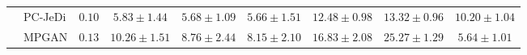 \begin{tabular}{llccccccc}
        & PC-JeDi  & $0.10$          & $5.83 \pm 1.44$                              & $5.68 \pm 1.09$                                & $5.66 \pm 1.51$                              & $12.48 \pm 0.98$                              & $13.32 \pm 0.96$                              & $10.20 \pm 1.04$                       \\
        & MPGAN    & $0.13$          & $10.26 \pm 1.51$                             & $8.76 \pm 2.44$                                & $8.15 \pm 2.10$                              & $16.83 \pm 2.08$                              & $25.27 \pm 1.29$                              & $5.64 \pm 1.01$                        \\
    \bottomrule
\end{tabular}
